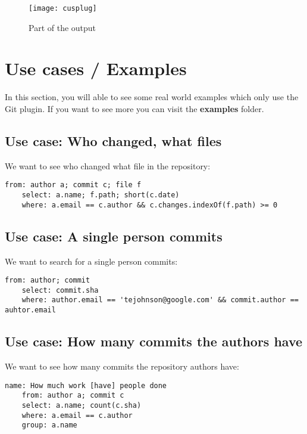\begin{figure}[H]
	\centering
	\texttt{[image: cusplug]}
	\caption{Part of the output}
	\label{fig:fig-cusplug}
\end{figure}


\section{Use cases / Examples}

In this section, you will able to see some real world examples which only use the Git plugin.
If you want to see more you can visit the \textbf{examples} folder.

\subsection{Use case: Who changed, what files}

We want to see who changed what file in the repository:

\begin{lstlisting}[caption={whochanged.yaml}]
	from: author a; commit c; file f
	select: a.name; f.path; short(c.date)
	where: a.email == c.author && c.changes.indexOf(f.path) >= 0
\end{lstlisting}

\subsection{Use case: A single person commits}

We want to search for a single person commits:

\begin{lstlisting}[caption={authorcommits.yaml}]
	from: author; commit
	select: commit.sha
	where: author.email == 'tejohnson@google.com' && commit.author == auhtor.email
\end{lstlisting}

\subsection{Use case: How many commits the authors have}

We want to see how many commits the repository authors have:

\begin{lstlisting}[caption={howmuchwork.yaml}]
	name: How much work [have] people done
	from: author a; commit c
	select: a.name; count(c.sha)
	where: a.email == c.author
	group: a.name
\end{lstlisting}
